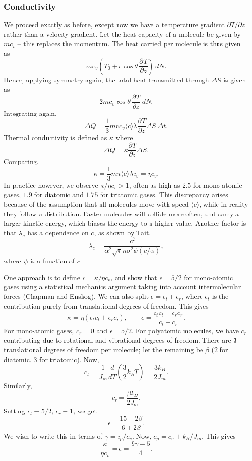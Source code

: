 \documentclass[11pt]{article}
\newcommand\dd[3][]{\frac{d^{#1}{#2}}{d {#3}^{#1}}}
\newcommand\pp[3][]{\frac{\partial^{#1}{#2}}{\partial {#3}^{#1}}}
\newcommand\E[1]{\langle #1 \rangle}
\theoremstyle{definition}
\theoremstyle{remark}
\numberwithin{equation}{section}
\begin{document}
    \subsubsection{Conductivity}
    We proceed exactly as before, except now we have a temperature gradient
    $\partial T / \partial z$ rather than a velocity gradient. Let the heat capacity
    of a molecule be given by $mc_v$ -- this replaces the momentum. The heat carried
    per molecule is thus given as \[
        mc_v\left(T_0 + r\cos\theta\,\pp{T}{z}\right)\:dN.
    \] Hence, applying symmetry again, the total heat transmitted through $\Delta S$
    is given as \[
        2mc_v\cos\theta\,\pp{T}{z}\:dN.
    \] Integrating again, \[
        \Delta Q = \frac{1}{3}mnc_v\E{c}\lambda \pp{T}{z}\Delta S\:\Delta t.
    \] Thermal conductivity is defined as $\kappa$ where \[
        \Delta Q = \kappa \pp{T}{z}\Delta S.
    \] Comparing, \[
        \kappa = \frac{1}{3}mn\E{c}\lambda c_v = \eta c_v.
    \] In practice however, we observe $\kappa / \eta c_v > 1$, often as high as
    $2.5$ for mono-atomic gases, $1.9$ for diatomic and $1.75$ for triatomic gases.
    This discrepancy arises because of the assumption that all molecules move with
    speed $\E{c}$, while in reality they follow a distribution. Faster molecules
    will collide more often, and carry a larger kinetic energy, which biases the
    energy to a higher value. Another factor is that $\lambda_c$ has a dependence on
    $c$, as shown by Tait. \[
        \lambda_c = \frac{c^2}{\alpha^2\sqrt{\pi}n\sigma^2\psi(c / \alpha)},
    \] where $\psi$ is a function of $c$.

    One approach is to define $\epsilon = \kappa/\eta c_v$, and show that
    $\epsilon = 5 / 2$ for mono-atomic gases using a statistical mechanics argument
    taking into account intermolecular forces (Chapman and Enskog). We can also
    split $\epsilon = \epsilon_t + \epsilon_r$, where $\epsilon_t$ is the
    contribution purely from translational degrees of freedom. This gives \[
        \kappa = \eta(\epsilon_tc_t + \epsilon_rc_r), \qquad 
        \epsilon = \frac{\epsilon_tc_t + \epsilon_rc_r}{c_t + c_r}.
    \] For mono-atomic gases, $c_r = 0$ and $\epsilon = 5 /2$. For polyatomic
    molecules, we have $c_r$ contributing due to rotational and vibrational degrees
    of freedom. There are $3$ translational degrees of freedom per molecule; let the
    remaining be $\beta$ ($2$ for diatomic, $3$ for triatomic). Now, \[
        c_t = \frac{1}{J_m}\dd{}{T}\left(\frac{3}{2}k_BT\right) = \frac{3k_B}{2J_m}.
    \] Similarly, \[
        c_r = \frac{\beta k_B}{2J_m}.
    \] Setting $\epsilon_t = 5 / 2$, $\epsilon_r = 1$, we get \[
        \epsilon = \frac{15 + 2\beta}{6 + 2\beta}.
    \] We wish to write this in terms of $\gamma = c_p / c_v$. Now, $c_p = c_v + k_B
    / J_m$. This gives \[
        \frac{\kappa}{\eta c_v} = \epsilon = \frac{9\gamma - 5}{4}.
    \] 
\end{document}
